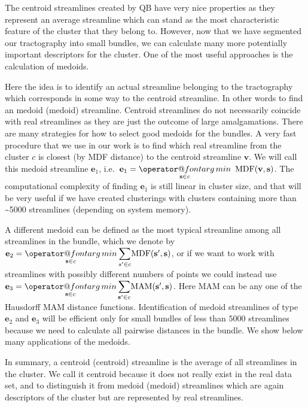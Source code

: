 \documentclass{bioinfo}
\makeatletter
\def\argmin{\mathop{\operator@font arg\,min}}
\makeatother
\begin{document}
\begin{methods}
The centroid streamlines created by QB have very nice properties as they
represent an average streamline which can stand as the most
characteristic feature of the cluster that they belong to. However, now
that we have segmented our tractography into small bundles, we can
calculate many more potentially important descriptors for the
cluster. One of the most useful approaches is the calculation of
medoids.

Here the idea is to identify an actual streamline belonging to the
tractography which corresponds in some way to the centroid streamline. In
other words to find an medoid (medoid) streamline. Centroid streamlines
do not necessarily coincide with real streamlines as they are just the
outcome of large amalgamations. There are many strategies for how to
select good medoids for the bundles. A very fast procedure that we use
in our work is to find which real streamline from the cluster $c$ is
closest (by MDF distance) to the centroid streamline $\mathbf{v}$. We
will call this medoid streamline $\mathbf{e}_{1}$,
i.e.~$\mathbf{e}_{1}={\displaystyle \argmin_{\mathbf{s} \in
    c}}\textrm{\,\ MDF}(\mathbf{v},\mathbf{s})$.  The computational
complexity of finding $\mathbf{e}_{1}$ is still linear in cluster size,
and that will be very useful if we have created clusterings with
clusters containing more than \textasciitilde5000 streamlines (depending
on system memory).

A different medoid can be defined as the most typical streamline among
all streamlines in the bundle, which we denote by
$\mathbf{e}_{2}={\displaystyle \argmin_{\mathbf{s} \in
    c}}\,{\displaystyle \sum_{s'\in
    c}}\mathrm{MDF}(\mathbf{s'},\mathbf{s})$, or if we want to work with
streamlines with possibly different numbers of points we could instead
use $\mathbf{e}_{3}={\displaystyle \argmin_{\mathbf{s} \in
    c}}\,{\displaystyle \sum_{\mathbf{s'}\in
    c}}\mathrm{MAM}(\mathbf{s'},\mathbf{s})$.  Here $\mathrm{MAM}$ can
be any one of the Hausdorff MAM distance functions.  Identification of
medoid streamlines of type $\mathbf{e}_{2}$ and $\mathbf{e}_{3}$ will
be efficient only for small bundles of less than $5000$ streamlines
because we need to calculate all pairwise distances in the bundle. We
show below many applications of the medoids.

In summary, a centroid (centroid) streamline is the average of all
streamlines in the cluster. We call it centroid because it does not
really exist in the real data set, and to distinguish it from medoid
(medoid) streamlines which are again descriptors of the cluster but are
represented by real streamlines.


\end{methods}
\end{document}
